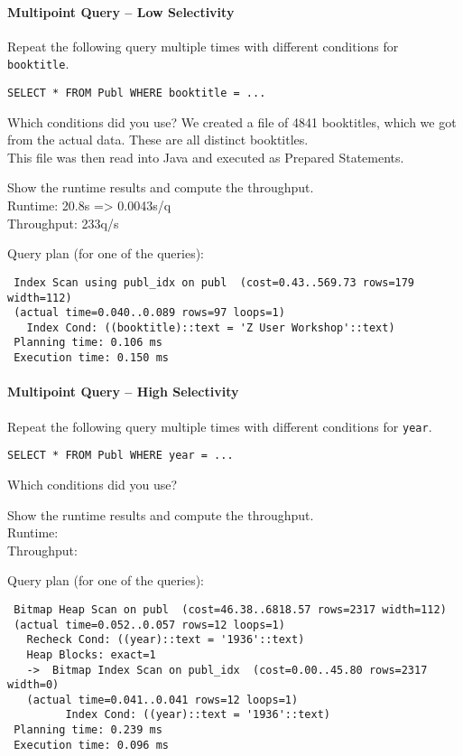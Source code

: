 \documentclass[11pt]{scrartcl}
\begin{document}
\paragraph{Multipoint Query -- Low Selectivity}

Repeat the following query multiple times with different conditions for {\tt booktitle}.

{\small
\begin{verbatim}
SELECT * FROM Publ WHERE booktitle = ...
\end{verbatim}
}

\noindent
Which conditions did you use?
We created a file of 4841 booktitles, which we got from the actual data. These are all distinct booktitles.\\
This file was then read into Java and executed as Prepared Statements.

\smallskip\noindent
Show the runtime results and compute the throughput.\\
Runtime: 20.8s => 0.0043s/q\\
Throughput: 233q/s

\smallskip\noindent
Query plan (for one of the queries):
{\small
\begin{verbatim}
 Index Scan using publ_idx on publ  (cost=0.43..569.73 rows=179 width=112)
 (actual time=0.040..0.089 rows=97 loops=1)
   Index Cond: ((booktitle)::text = 'Z User Workshop'::text)
 Planning time: 0.106 ms
 Execution time: 0.150 ms
\end{verbatim}
}


\paragraph{Multipoint Query -- High Selectivity}

Repeat the following query multiple times with different conditions for {\tt year}.

{\small
\begin{verbatim}
SELECT * FROM Publ WHERE year = ...
\end{verbatim}
}

\noindent
Which conditions did you use?

\smallskip\noindent
Show the runtime results and compute the throughput.\\
Runtime: \\
Throughput: 

\smallskip\noindent
Query plan (for one of the queries):
{\small
\begin{verbatim}
 Bitmap Heap Scan on publ  (cost=46.38..6818.57 rows=2317 width=112)
 (actual time=0.052..0.057 rows=12 loops=1)
   Recheck Cond: ((year)::text = '1936'::text)
   Heap Blocks: exact=1
   ->  Bitmap Index Scan on publ_idx  (cost=0.00..45.80 rows=2317 width=0)
   (actual time=0.041..0.041 rows=12 loops=1)
         Index Cond: ((year)::text = '1936'::text)
 Planning time: 0.239 ms
 Execution time: 0.096 ms
\end{verbatim}
}
\end{document}
